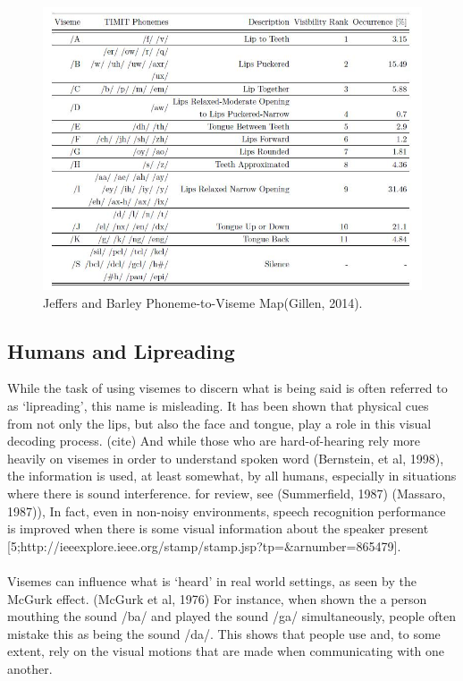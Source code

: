 \documentclass[12pt,twoside]{report}
\begin{document}
\begin{figure}[tb]
\centering
\includegraphics[width = 1.0\hsize]{./figures/jeffersbarleyvisememap}
\caption{Jeffers and Barley Phoneme-to-Viseme Map(Gillen, 2014).}
\label{fig:logo}
\end{figure}


		\subsection{Humans and Lipreading}
While the task of using visemes to discern what is being said is often referred to as ‘lipreading’, this name is misleading. It has been shown that physical cues from not only the lips, but also the face and tongue, play a role in this visual decoding process. (cite) And while those who are hard-of-hearing rely more heavily on visemes in order to understand spoken word (Bernstein, et al, 1998), the information is used, at least somewhat, by all humans, especially in situations where there is sound interference. for review, see (Summerfield, 1987) (Massaro, 1987)), In fact, even in non-noisy environments, speech recognition performance is improved when there is some visual information about the speaker present [5;http://ieeexplore.ieee.org/stamp/stamp.jsp?tp=\&arnumber=865479].
\\ \\
Visemes can influence what is ‘heard’ in real world settings, as seen by the McGurk effect. (McGurk et al, 1976) For instance, when shown the a person mouthing the sound /ba/ and played the sound /ga/ simultaneously, people often mistake this as being the sound /da/. This shows that people use and, to some extent, rely on the visual motions that are made when communicating with one another. 
\end{document}

